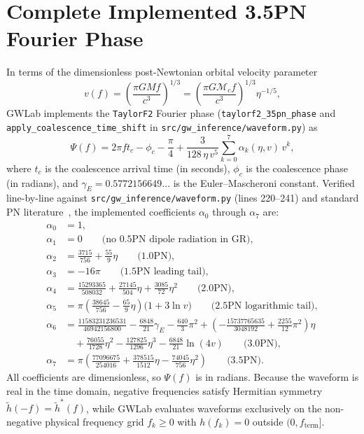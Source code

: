 \documentclass[11pt,a4paper]{report}
\begin{document}
\section{Complete Implemented 3.5PN Fourier Phase}
In terms of the dimensionless post-Newtonian orbital velocity parameter
\begin{equation}
v(f) = \left(\frac{\pi G M f}{c^3}\right)^{1/3} = \left(\frac{\pi G \mathcal{M}_c f}{c^3}\right)^{1/3} \eta^{-1/5},
\end{equation}
GWLab implements the \texttt{TaylorF2} Fourier phase (\texttt{taylorf2\_35pn\_phase} and \texttt{apply\_coalescence\_time\_shift} in \texttt{src/gw\_inference/waveform.py}) as
\begin{equation}
\Psi(f) = 2\pi f t_c - \phi_c - \frac{\pi}{4} + \frac{3}{128\,\eta\,v^5}\sum_{k=0}^{7} \alpha_k(\eta, v)\,v^k,
\end{equation}
where $t_c$ is the coalescence arrival time (in seconds), $\phi_c$ is the coalescence phase (in radians), and $\gamma_E = 0.5772156649\dots$ is the Euler--Mascheroni constant. Verified line-by-line against \texttt{src/gw\_inference/waveform.py} (lines 220--241) and standard PN literature~\cite{Buonanno2009}, the implemented coefficients $\alpha_0$ through $\alpha_7$ are:
\begin{align}
\alpha_0 &= 1, \\
\alpha_1 &= 0 \qquad \text{(no $0.5\mathrm{PN}$ dipole radiation in GR)}, \\
\alpha_2 &= \frac{3715}{756} + \frac{55}{9}\eta \qquad \text{($1.0\mathrm{PN}$)}, \\
\alpha_3 &= -16\pi \qquad \text{($1.5\mathrm{PN}$ leading tail)}, \\
\alpha_4 &= \frac{15293365}{508032} + \frac{27145}{504}\eta + \frac{3085}{72}\eta^2 \qquad \text{($2.0\mathrm{PN}$)}, \\
\alpha_5 &= \pi\left(\frac{38645}{756} - \frac{65}{9}\eta\right)\big(1 + 3\ln v\big) \qquad \text{($2.5\mathrm{PN}$ logarithmic tail)}, \\
\alpha_6 &= \frac{11583231236531}{46942156800} - \frac{6848}{21}\gamma_E - \frac{640}{3}\pi^2 + \left(-\frac{15737765635}{3048192} + \frac{2255}{12}\pi^2\right)\eta \nonumber\\
         &\quad + \frac{76055}{1728}\eta^2 - \frac{127825}{1296}\eta^3 - \frac{6848}{21}\ln(4v) \qquad \text{($3.0\mathrm{PN}$)}, \\
\alpha_7 &= \pi\left(\frac{77096675}{254016} + \frac{378515}{1512}\eta - \frac{74045}{756}\eta^2\right) \qquad \text{($3.5\mathrm{PN}$)}.
\end{align}
All coefficients are dimensionless, so $\Psi(f)$ is in radians. Because the waveform is real in the time domain, negative frequencies satisfy Hermitian symmetry $\tilde{h}(-f) = \tilde{h}^*(f)$, while GWLab evaluates waveforms exclusively on the non-negative physical frequency grid $f_k \ge 0$ with $h(f_k) = 0$ outside $(0, f_{\mathrm{term}}]$.
\end{document}
